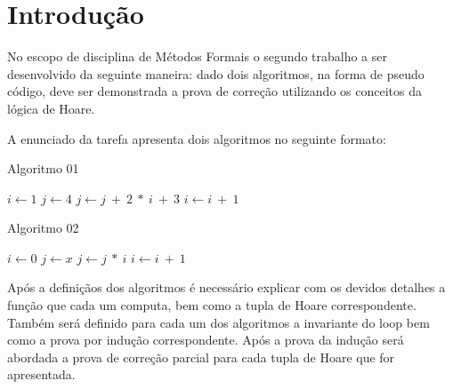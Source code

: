 \section{Introdução}
No escopo de disciplina de Métodos Formais o segundo trabalho a ser desenvolvido
da seguinte maneira: dado dois algoritmos, na forma de pseudo código, deve ser
demonstrada a prova de correção utilizando os conceitos da lógica de Hoare.

A enunciado da tarefa apresenta dois algoritmos no seguinte formato:

\begin{algorithm}
    \caption{Algoritmo 01}\label{alg01}
    \begin{algorithmic}
        \State $i\gets 1$
        \State $j\gets 4$
        \State $j \gets j\ +\ 2\ *\ i\ +\ 3$
        \State $i\gets i\ +\ 1$
        \EndWhile\label{euclidendwhile}
        \EndFunction
    \end{algorithmic}
\end{algorithm}

\begin{algorithm}
    \caption{Algoritmo 02}\label{alg02}
    \begin{algorithmic}
        \State $i\gets 0$
        \State $j\gets x$
        \State $j \gets j\ *\ i$
        \State $i\gets i\ +\ 1$
        \EndWhile\label{euclidendwhile}
        \EndFunction
    \end{algorithmic}
\end{algorithm}

Após a definiçãos dos algoritmos é necessário explicar com os devidos detalhes
a função que cada um computa, bem como a tupla de Hoare correspondente. Também
será definido para cada um dos algoritmos a invariante do loop bem como a prova
por indução correspondente. Após a prova da indução será abordada a prova de
correção parcial para cada tupla de Hoare que for apresentada.
